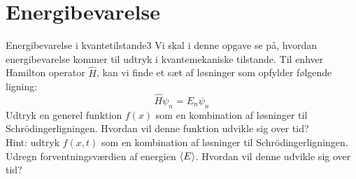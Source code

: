 \section*{Energibevarelse}
\begin{opgave}{Energibevarelse i kvantetilstande}{3}
Vi skal i denne opgave se på, hvordan energibevarelse kommer til udtryk i kvantemekaniske tilstande. Til enhver Hamilton operator $\hat{H}$, kan vi finde et sæt af løsninger som opfylder følgende ligning: 
$$
\hat{H}\psi_n=E_n\psi_n
$$
\opg Udtryk en generel funktion $f(x)$ som en kombination af løsninger til Schrödingerligningen.
\opg Hvordan vil denne funktion udvikle sig over tid?\\
Hint: udtryk $f(x,t)$ som en kombination af løsninger til Schrödingerligningen.
\opg Udregn forventningsværdien af energien $\left< E \right>$. Hvordan vil denne udvikle sig over tid?
\end{opgave}
